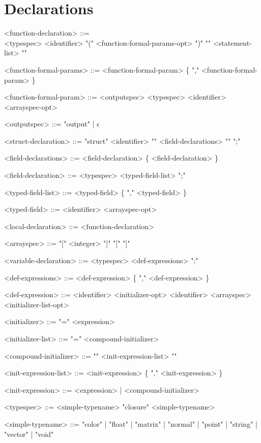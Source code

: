 \documentclass[11pt,letterpaper]{book}
\begin{document}
\section*{Declarations}
\begin{grammar}

<function-declaration> ::= \spc \\ <typespec> <identifier> 
      "(" <function-formal-params-opt> ")" "{" <statement-list> "}"

<function-formal-params> ::= <function-formal-param> \{ "," <function-formal-param> \}

<function-formal-param> ::= <outputspec> <typespec> <identifier> <arrayspec-opt>

<outputspec> ::= "output" | $\epsilon$

<struct-declaration> ::= "struct" <identifier> "{" <field-declarations> "}" ";"

<field-declarations> ::= <field-declaration> \{ <field-declaration> \}

<field-declaration> ::= <typespec> <typed-field-list> ";"

<typed-field-list> ::= <typed-field> \{ "," <typed-field> \}

<typed-field> ::= <identifier> <arrayspec-opt>

<local-declaration> ::= <function-declaration>

<arrayspec> ::= "[" <integer> "]"
\alt "[" "]"

<variable-declaration> ::= <typespec> <def-expressions> ";"

<def-expressions> ::= <def-expression> \{ "," <def-expression> \}

<def-expression> ::= <identifier> <initializer-opt>
\alt <identifier> <arrayspec> <initializer-list-opt>

<initializer> ::= "=" <expression>

<initializer-list> ::= "=" <compound-initializer>

<compound-initializer> ::= "{" <init-expression-list> "}"

<init-expression-list> ::= <init-expression> \{ "," <init-expression> \}

<init-expression> ::= <expression> | <compound-initializer>

<typespec> ::= <simple-typename> 
\alt "closure" <simple-typename>

<simple-typename> ::= 
"color"
| "float"
| "matrix"
| "normal"
| "point"
| "string"
| "vector"
| "void"

\end{grammar}
\end{document}

